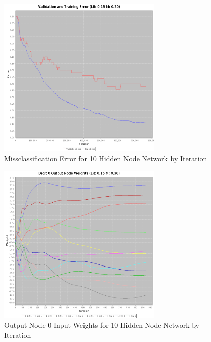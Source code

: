 \documentclass{article}
\begin{document}
\begin{figure}
\centering
\includegraphics[width=0.7\textwidth]{data/final/10_hidden_nodes_error.png}
\caption{Missclassification Error for 10 Hidden Node Network by Iteration}
\label{error10}
\end{figure}

\begin{figure}
\centering
\includegraphics[width=0.7\textwidth]{data/final/10_hidden_nodes.png}
\caption{Output Node 0 Input Weights for 10 Hidden Node Network by Iteration}
\label{weight10}
\end{figure}
\end{document}
